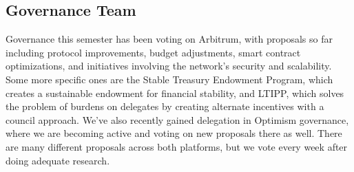 \documentclass[10pt]{article}
\begin{document}
\begin{parcolumns}{3}
{        \subsection*{Governance Team}
            Governance this semester has been voting on Arbitrum, with proposals so far including protocol improvements, budget adjustments, smart contract optimizations, and initiatives involving the network's security and scalability. Some more specific ones are the Stable Treasury Endowment Program, which creates a sustainable endowment for financial stability, and LTIPP, which solves the problem of burdens on delegates by creating alternate incentives with a council approach. We've also recently gained delegation in Optimism governance, where we are becoming active and voting on new proposals there as well. There are many different proposals across both platforms, but we vote every week after doing adequate research.
    }
\end{parcolumns}

\begin{parcolumns}{3}
    \colchunk{
        
    }
    \colchunk{
       
    }
\end{parcolumns}
\end{document}
